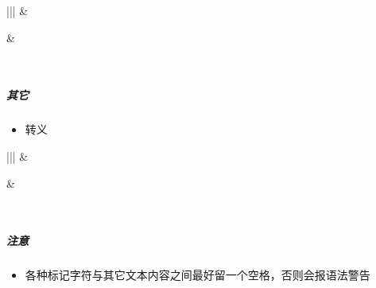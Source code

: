 \documentclass[a4paper,10pt,english]{sphinxmanual}
\begin{document}
\begin{savenotes}\sphinxattablestart
\centering
\begin{tabular}[t]{|||}
\hline
{}\relax &\relax \\
\hline\begin{sphinxfigure-in-table}
\centering

\noindent{}
\end{sphinxfigure-in-table}\relax
&\begin{sphinxfigure-in-table}
\centering

\noindent{}
\end{sphinxfigure-in-table}\relax
\\
\hline
\end{tabular}
\par
\sphinxattableend\end{savenotes}


\subparagraph{其它}
\label{\detokenize{sphinx/1-generate/4-edit:id14}}\begin{itemize}
\item {} 
转义

\end{itemize}


\begin{savenotes}\sphinxattablestart
\centering
\begin{tabular}[t]{|||}
\hline
{}\relax &\relax \\
\hline\begin{sphinxfigure-in-table}
\centering

\noindent{}
\end{sphinxfigure-in-table}\relax
&\begin{sphinxfigure-in-table}
\centering

\noindent{}
\end{sphinxfigure-in-table}\relax
\\
\hline
\end{tabular}
\par
\sphinxattableend\end{savenotes}


\subparagraph{注意}
\label{\detokenize{sphinx/1-generate/4-edit:id15}}\begin{itemize}
\item {} 
各种标记字符与其它文本内容之间最好留一个空格，否则会报语法警告

\end{itemize}
\end{document}
